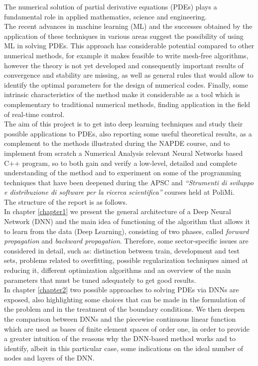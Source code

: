 \documentclass[12pt, a4paper]{report}
\theoremstyle{definition}
\begin{document}
The numerical solution of partial derivative equations (PDEs) plays a fundamental role in applied mathematics, science and engineering. \\
The recent advances in machine learning (ML) and the successes obtained by the application of these techniques in various areas suggest the possibility of using ML in solving PDEs. This approach has considerable potential compared to other numerical methods, for example it makes feasible to write mesh-free algorithms, however the theory is not yet developed and consequently important results of convergence and stability are missing, as well as general rules that would allow to identify the optimal parameters for the design of numerical codes. Finally, some intrinsic characteristics of the method make it considerable as a  tool which is complementary to traditional numerical methods, finding application in the field of real-time control. \\
The aim of this project is to get into deep learning techniques and study their  possible applications to PDEs, also reporting some useful theoretical results, as a complement to the methods illustrated during the NAPDE course, and to implement from scratch a Numerical Analysis relevant Neural Networks based C++ program, so to both gain and verify a low-level, detailed and complete understanding of the method and to experiment on some of the programming techniques that have been deepened during the APSC and \textit{``Strumenti di sviluppo e distribuzione di software per la ricerca scientifica''} courses held at PoliMi.\\
The structure of the report is as follows.\\
In chapter \ref{chapter1} we present the general architecture of a Deep Neural Network (DNN) and the main idea of functioning of the algorithm that allows it to learn from the data (Deep Learning), consisting of two phases, called \textit{forward propagation} and \textit{backward propagation}. Therefore, some  sector-specific issues are considered in detail, such as: distinction between train, development and test sets, problems related to overfitting, possible regularization techniques aimed at reducing it, different optimization algorithms and an overview of the main parameters that must be tuned adequately to get good results.\\
In chapter \ref{chapter2} two possible approaches to solving PDEs via DNNs are exposed, also highlighting some choices that can be made in the formulation of the problem and in the treatment of the boundary conditions. We then deepen the comparison between DNNs and the piecewise continuous linear function which are used as bases of finite element spaces of order one, in order to provide a greater intuition of the reasons why the DNN-based method works and to identify, albeit in this particular case, some indications on the ideal number of nodes and layers of the DNN.\\
\end{document}
